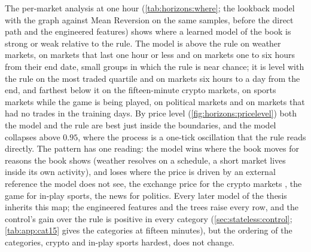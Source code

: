 The per-market analysis at one hour (\cref{tab:horizons:where}; the lookback model with the
graph against Mean Reversion on the same samples, before the direct path and the engineered
features) shows where a learned model of the book is strong or weak relative to the rule.
The model is above the rule on weather markets, on markets that last one hour or less and
on markets one to six hours from their end date, small groups in which the rule is near
chance; it is level with the rule on the most traded quartile and on markets six hours to a
day from the end, and farthest below it on the
fifteen-minute crypto markets, on sports markets while the game is being played, on
political markets and on markets that had no trades in the training days.  By price level
(\cref{fig:horizons:pricelevel}) both the model and the rule are best just inside the
boundaries, and the model collapses above $0.95$, where the process is a one-tick
oscillation that the rule reads directly.  The pattern has one reading: the model wins where
the book moves for reasons the book shows (weather resolves on a schedule, a short market
lives inside its own activity), and loses where the price is driven by an external
reference the model does not see, the exchange price for the crypto markets
\cite{young2026openmarket}, the game for in-play sports, the news for politics.  Every later
model of the thesis inherits this map; the engineered features and the trees raise every
row, and the control's gain over the rule is positive in every category
(\cref{sec:stateless:control}; \cref{tab:app:cat15} gives the categories at fifteen minutes), but the ordering of the categories, crypto and in-play
sports hardest, does not change.

